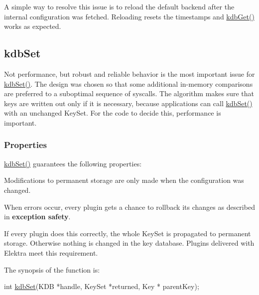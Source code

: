 A simple way to resolve this issue is to reload the default backend after the internal configuration was fetched. Reloading resets the timestamps and {\ttfamily \hyperlink{group__kdb_ga28e385fd9cb7ccfe0b2f1ed2f62453a1}{kdb\+Get()}} works as expected.

\subsection*{kdb\+Set}

Not performance, but robust and reliable behavior is the most important issue for {\ttfamily \hyperlink{group__kdb_ga11436b058408f83d303ca5e996832bcf}{kdb\+Set()}}. The design was chosen so that some additional in-\/memory comparisons are preferred to a suboptimal sequence of {\ttfamily syscalls}. The algorithm makes sure that keys are written out only if it is necessary, because applications can call {\ttfamily \hyperlink{group__kdb_ga11436b058408f83d303ca5e996832bcf}{kdb\+Set()}} with an unchanged {\ttfamily Key\+Set}. For the code to decide this, performance is important.

\subsubsection*{Properties}

{\ttfamily \hyperlink{group__kdb_ga11436b058408f83d303ca5e996832bcf}{kdb\+Set()}} guarantees the following properties\+:


\begin{DoxyItemize}
\item Modifications to permanent storage are only made when the configuration was changed.
\item When errors occur, every plugin gets a chance to rollback its changes as described in {\bfseries exception safety}.
\item If every plugin does this correctly, the whole {\ttfamily Key\+Set} is propagated to permanent storage. Otherwise nothing is changed in the key database. Plugins delivered with Elektra meet this requirement.
\end{DoxyItemize}

The synopsis of the function is\+:


\begin{DoxyCode}
\textcolor{keywordtype}{int} \hyperlink{group__kdb_ga11436b058408f83d303ca5e996832bcf}{kdbSet}(KDB *handle, KeySet *returned, Key * parentKey);
\end{DoxyCode}


